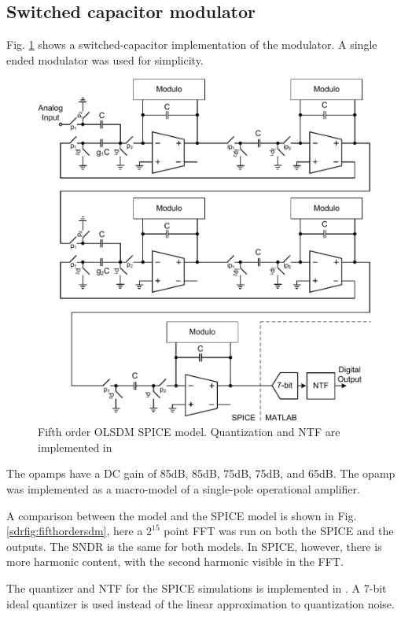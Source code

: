 \subsection{Switched capacitor modulator}
Fig.
\ref{sdrfig:osdr3spice} shows a switched-capacitor implementation of
the modulator. A single ended modulator was used for simplicity. 
\begin{figure}[htbp]
\centerline{ \includegraphics[width=\myfigwidth]{graphics/osdr21_spice_sch}}
  \caption{Fifth order OLSDM SPICE model. Quantization and NTF are implemented in \matlab}
  \label{sdrfig:osdr3spice}
\end{figure}

The opamps have a DC gain of 85dB, 85dB, 75dB, 75dB, and 65dB.
The opamp was implemented as a macro-model of a single-pole operational amplifier.

A
comparison between the \matlab model and the SPICE model is shown in
Fig. \ref{sdrfig:fifthordersdm}, here a $2^{15}$ point FFT was run on both
the SPICE and the \matlab outputs. The SNDR is the same for both
models. In SPICE, however, there is more harmonic content, with the second
harmonic visible in the FFT.

The quantizer and NTF for the SPICE simulations is implemented in
\matlab. A 7-bit ideal quantizer is used instead of the linear
approximation to quantization noise. 

